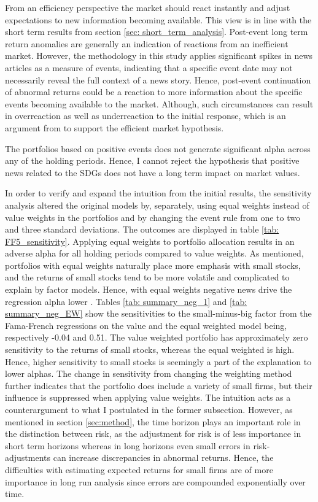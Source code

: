 From an efficiency perspective the market should react instantly and adjust expectations to new information becoming available. This view is in line with the short term results from section \ref{sec: short_term_analysis}. Post-event long term return anomalies are generally an indication of reactions from an inefficient market. However, the methodology in this study applies significant spikes in news articles as a measure of events, indicating that a specific event date may not necessarily reveal the full context of a news story. Hence, post-event continuation of abnormal returns could be a reaction to more information about the specific events becoming available to the market. Although, such circumstances can result in overreaction as well as underreaction to the initial response, which is an argument from \cite{fama1998_events} to support the efficient market hypothesis.   

The portfolios based on positive events does not generate significant alpha across any of the holding periods. Hence, I cannot reject the hypothesis that positive news related to the SDGs does not have a long term impact on market values. 

In order to verify and expand the intuition from the initial results, the sensitivity analysis altered the original models by, separately, using equal weights instead of value weights in the portfolios and by changing the event rule from one to two and three standard deviations. The outcomes are displayed in table \ref{tab: FF5_sensitivity}. Applying equal weights to portfolio allocation results in an adverse alpha for all holding periods compared to value weights. As mentioned, portfolios with equal weights naturally place more emphasis with small stocks, and the returns of small stocks tend to be more volatile and complicated to explain by factor models. Hence, with equal weights negative news drive the regression alpha lower \cite{Fama_french_3fac}. Tables \ref{tab: summary_neg_1} and \ref{tab: summary_neg_EW} show the sensitivities to the small-minus-big factor from the Fama-French regressions on the value and the equal weighted model being, respectively -0.04 and 0.51. The value weighted portfolio has approximately zero sensitivity to the returns of small stocks, whereas the equal weighted is high. Hence, higher sensitivity to small stocks is seemingly a part of the explanation to lower alphas. The change in sensitivity from changing the weighting method further indicates that the portfolio does include a variety of small firms, but their influence is suppressed when applying value weights. The intuition acts as a counterargument to what I postulated in the former subsection. However, as mentioned in section \ref{sec:method}, the time horizon plays an important role in the distinction between risk, as the adjustment for risk is of less importance in short term horizons whereas in long horizons even small errors in risk-adjustments can increase discrepancies in abnormal returns. Hence, the difficulties with estimating expected returns for small firms are of more importance in long run analysis since errors are compounded exponentially over time.  

